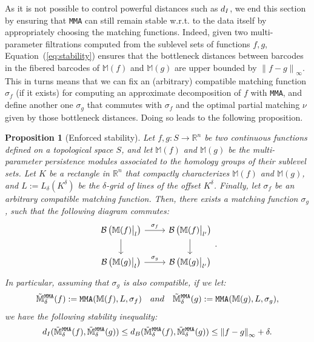 \documentclass{article}
\newcommand{\norm}[1]{\left\lVert #1 \right\rVert}
\newcommand{\barcode}[1]{ {\mathcal B}\left(#1\right) }
\newcommand{\simpcomp}{S}
\newcommand{\matching}{\sigma}
\newcommand{\R}{\mathbb{R}}
\newcommand{\Mbb}{\mathbb{M}}
\newcommand{\M}{{\mathbb M}}
\newcommand{\disti}{{d_{\rm I}}}
\newcommand{\distb}{{d_{\rm B}}}
\newcommand\restr[2]{{  \left.\kern-\nulldelimiterspace #1 \vphantom{\big|} \right|_{#2}  }}
\newcommand{\MMA}{\texttt{MMA}}
\newcommand{\mMMA}{\mathtt{MMA}}
\newcommand{\mmaoutcompat}{approximate}
\newcommand{\compacityassumption}{compactly characterizes}
\newtheorem{proposition}[theorem]{Proposition}%
\newcommand{\rebuttal}[1]{{ #1}}
\begin{document}
As it is not possible to control powerful distances such as $\disti$, 
we end this section by ensuring that \MMA{} can still remain stable w.r.t. to the data itself by appropriately 
choosing the matching functions.
Indeed, given two multi-parameter filtrations computed from the sublevel sets of functions $f,g$, Equation~(\ref{eq:stability}) ensures that the bottleneck distances between barcodes in the fibered barcodes of $\M(f)$ and $\M(g)$ are upper bounded by $\norm{f-g}_\infty$. This in turns means that we can fix an (arbitrary) compatible matching function $\matching_f$ (if it exists) for computing an \mmaoutcompat{} decomposition of $f$ with \MMA{}, and define another one $\matching_g$ that commutes with $\matching_f$ and the optimal partial matching $\nu$ given by those bottleneck distances. Doing so 
leads to the following proposition. \\ %





\begin{proposition}[Enforced stability]\label{prop:mma_stab}
	Let $f,g:\simpcomp\to\R^n$ be two continuous functions defined on a
	topological space $\simpcomp$, and let $\Mbb(f)$ and $\Mbb(g)$ be 
	the
	multi-parameter persistence modules associated to the homology groups of their
	sublevel sets. %
	Let $K$ be a rectangle in $\R^n$ %
	\rebuttal{that \compacityassumption{}  
	$\Mbb(f)$ and $\Mbb(g)$},
	and $L:=L_\delta(K^\delta)$ be the $\delta$-grid of lines of the offset $K^\delta$.
	Finally, let $\sigma_f$ be an arbitrary compatible matching function.
	Then, there exists a matching function $\sigma_g$,
	such that the following diagram commutes:
	\begin{equation}
		\begin{tikzcd}
			\barcode{\restr{\Mbb(f)}{l}}
			\arrow{r}{\sigma_{f}}
			\arrow{d}{}
			&
			\barcode{\restr{\Mbb(f)}{l'}}
			\arrow{d}{}
			\\
			\barcode{\restr{\Mbb(g)}{l}}
			\arrow{r}{\sigma_{g}}
			&
			\barcode{\restr{\Mbb(g)}{l'}}
		\end{tikzcd}.
	\end{equation}
	In particular, assuming that $\sigma_g$ is also compatible,
	if we let: %
	\begin{equation}
		\tilde\M^{\mMMA{}}_\delta(f):=\mMMA(\Mbb(f),L,\matching_f)
		\quad
		\textnormal{and}
		\quad
		\tilde\M^{\mMMA{}}_\delta(g):=\mMMA(\Mbb(g),L,\matching_g),
	\end{equation}
	we have the following stability inequality:
	\begin{equation}
		\disti(\tilde\M^{\mMMA{}}_\delta(f), \tilde\M^{\mMMA{}}_\delta(g))\leq
		\distb(\tilde\M^{\mMMA{}}_\delta(f), \tilde\M^{\mMMA{}}_\delta(g))\leq
		\norm{f-g}_\infty + \delta.
	\end{equation}
\end{proposition}
\end{document}
